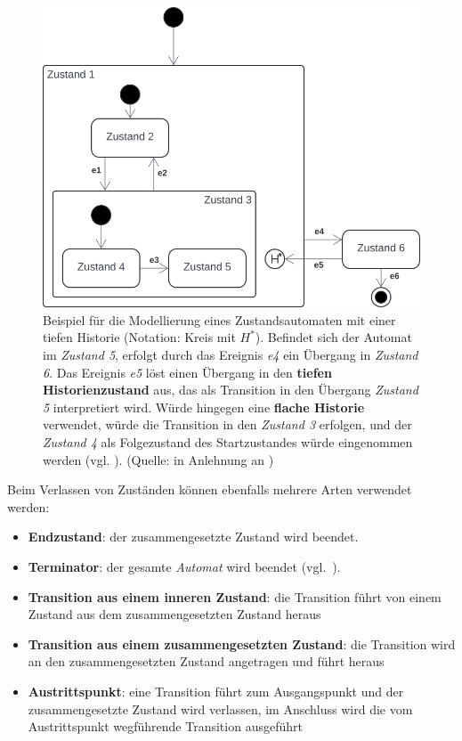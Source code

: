 \begin{figure}
    \centering
    \includegraphics[scale=0.4]{part three/Zustandsautomaten/img/tiefehistorie}
    \caption{Beispiel für die Modellierung eines Zustandsautomaten mit einer tiefen Historie (Notation: Kreis mit $H^*$). Befindet sich der Automat im \textit{Zustand 5}, erfolgt durch das Ereignis \textit{e4} ein Übergang in \textit{Zustand 6}. Das Ereignis \textit{e5} löst einen Übergang in den \textbf{tiefen Historienzustand} aus, das als Transition in den Übergang \textit{Zustand 5} interpretiert wird. Würde hingegen eine \textbf{flache Historie} verwendet, würde die Transition in den \textit{Zustand 3} erfolgen, und der \textit{Zustand 4} als Folgezustand des Startzustandes würde eingenommen werden (vgl. \cite[342 f.]{Bal05}). (Quelle: in Anlehnung an \cite[342, Abb. 6.11-7]{Bal05})}
    \label{fig:tiefehistorie}
\end{figure}


\noindent
Beim Verlassen von Zuständen können ebenfalls mehrere Arten verwendet werden:

\begin{itemize}
    \item \textbf{Endzustand}: der zusammengesetzte Zustand wird beendet.
    \item \textbf{Terminator}: der gesamte \textit{Automat} wird beendet (vgl.~\cite[73]{Buh09}).
    \item \textbf{Transition aus einem inneren Zustand}: die Transition führt von einem Zustand aus dem zusammengesetzten Zustand heraus
    \item \textbf{Transition aus einem zusammengesetzten Zustand}: die Transition wird an den zusammengesetzten Zustand angetragen und führt heraus
    \item \textbf{Austrittspunkt}: eine Transition führt zum Ausgangspunkt und der zusammengesetzte Zustand wird verlassen, im Anschluss wird die vom Austrittspunkt wegführende Transition ausgeführt
\end{itemize}



